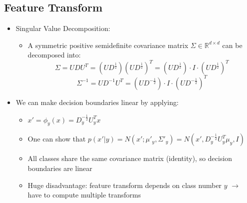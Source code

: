 \subsection*{Feature Transform}
\begin{itemize}
    \item
        Singular Value Decomposition:
        \begin{itemize}
            \item
                A symmetric positive semidefinite covariance matrix $\Sigma \in \mathbb{R}^{d \times d}$ can be decomposed into:
                $$\Sigma = U D U^T = (UD^{\frac{1}{2}})(UD^{\frac{1}{2}})^T = (UD^{\frac{1}{2}}) \cdot I \cdot (UD^{\frac{1}{2}})^T$$
                $$\Sigma^{-1} = U D^{-1} U^T = (UD^{-\frac{1}{2}}) \cdot I \cdot (UD^{-\frac{1}{2}})^T$$
        \end{itemize}
    \item
        We can make decision boundaries linear by applying:
        \begin{itemize}
            \item
                $x'  = \phi_y(x) = D_y^{-\frac{1}{2}} U_y^T x$ 
            \item
                One can show that $p(x'|y) = N(x'; \mu'_y, \Sigma'_y) = N(x', D_y^{-\frac{1}{2}} U_y^T \mu_y, I)$
            \item
                All classes share the same covariance matrix (identity), so decision boundaries are linear
            \item
                Huge disadvantage: feature transform depends on class number $y$ $\rightarrow$ have to compute multiple transforms
        \end{itemize}
\end{itemize}
